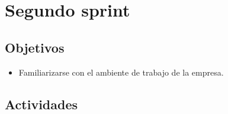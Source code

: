 \section{Segundo sprint} %
\label{sec:segundo_sprint}

\subsection{Objetivos}

\begin{itemize}
	\item Familiarizarse con el ambiente de trabajo de la empresa.
\end{itemize}

\subsection{Actividades} %
\label{sub:actividades}

